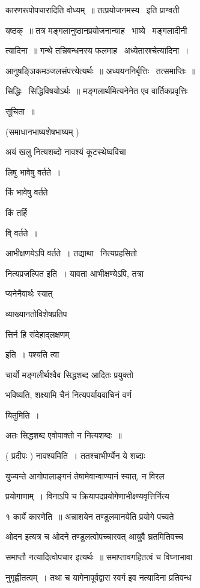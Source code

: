 \documentclass[11pt, openany]{book}
\begin{document}
कारणरूपोपचारादिति वोध्यम्~॥ तत्प्रयोजनमस्य \textendash\ इति प्राग्वती \textendash\ 

यष्ठक्~॥ तत्र मङ्गलानुष्ठानप्रयोजनान्याह \textendash\ भाष्ये \textendash\ मङ्गलादीनी \textendash\ 

त्यादिना~॥ गन्थे तन्निबन्धनस्य फलमाह \textendash\ अध्येतारश्चेत्यादिना~। 

आनुषङ्ञिकमञ्जलसंपत्त्येत्यर्थः~॥ अध्ययननिर्बृत्तिः \textendash\ तत्समाप्तिः~॥ 

सिद्धिः \textendash\ सिद्धिविषयोऽर्थः~॥ मङ्गलार्थमित्यनेनेत एव वार्तिकप्रवृत्तिः 

सूचिता~॥ 

(समाधानभाष्यशेषभाष्यम् ) 

अयं खलु नित्यशब्दो नावश्यं कूटस्थेष्वविचा \textendash\ 

लिषु भावेषु वर्तते~। 

किं भावेषु वर्तते 

किं तर्हि 

वि् वर्तते~। 

आभीक्षणयेऽपि वर्तते~। तद्याथा \textendash\ नित्यप्रहसितो 

 नित्यप्रजल्पित इति~। यावता आभीक्षण्येऽपि, तत्रा \textendash\ 

प्यनेनैवार्थः स्यात् \textendash\ {\qt व्याख्यानतोविशेषप्रतिप

त्तिर्न हि संदेहाद्लक्षणम्} इति~। पश्यति त्वा \textendash\ 

चार्यो मङ्गलीर्थश्वैव सिद्धशब्द आदितः प्रयुक्तो 

भविष्यति, शक्ष्यामि चैनं नित्यपर्यायवाचिनं वर्ण \textendash\ 

यितुमिति~। 

अतः सिद्धशब्द एवोपाक्तो न नित्यशब्दः~॥ 

( प्रदीपः ) नावश्यमिति~। ततश्चाभीर्ण्येन ये शब्दाः 

युज्यन्ते आगोपालाङ्गनं तेषामेवान्वाण्यानं स्यात्, न विरल \textendash\ 

प्रयोगाणाम्~। विनाऽपि च क्रियापदप्रयोगेणाभीक्ष्ण्यवृत्तिर्नित्य \textendash\ 



१ कार्ये कारणेति~॥ अन्नाशयेन तण्डुलमानयेति प्रयोगे पच्यते 

ओदन इत्यत्र च ओदने तण्डुलत्वोपच्चारवत् आयु्वै घ्रतमितिवच्च 

समाप्तौ नत्यादित्वोपचार इत्यर्थः~॥ समाप्तावगहितत्वं च विघ्नाभावा \textendash\ 

नुगृह्वीतत्वम्~। तथा च यागेनापूर्वद्वारा स्वर्ग इव नत्यादिना प्रतिवन्ध \textendash\ 
\end{document}
